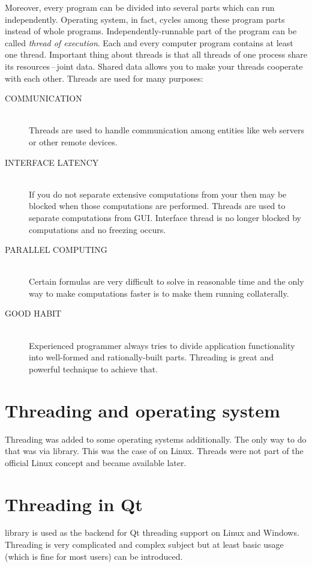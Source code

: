 Moreover, every program can be divided into several parts which can run independently. Operating system, in fact, cycles among these program parts instead of whole programs. Independently-runnable part of the program can be called \textit{thread of execution}. Each and every computer program contains at least one thread. Important thing about threads is that all threads of one process share its resources\,--\,joint data. Shared data allows you to make your threads cooperate with each other. Threads are used for many purposes:
\begin{description}
\item[COMMUNICATION] \hfill \\
Threads are used to handle communication among entities like web servers or other remote devices.
\item[INTERFACE LATENCY] \hfill \\
If you do not separate extensive computations from your  then  may be blocked when those computations are performed. Threads are used to separate computations from GUI. Interface thread is no longer blocked by computations and no freezing occurs.
\item[PARALLEL COMPUTING] \hfill \\
Certain formulas are very difficult to solve in reasonable time and the only way to make computations faster is to make them running collaterally.
\item[GOOD HABIT] \hfill \\
Experienced programmer always tries to divide application functionality into well-formed and rationally-built parts. Threading is great and powerful technique to achieve that.
\end{description}

\section{Threading and operating system}
Threading was added to some operating systems additionally. The only way to do that was via library. This was the case of  on Linux. Threads were not part of the official Linux concept and became available later.

\section{Threading in Qt}
 library is used as the backend for Qt threading support on Linux and Windows. Threading is very complicated and complex subject but at least basic usage (which is fine for most users) can be introduced.

